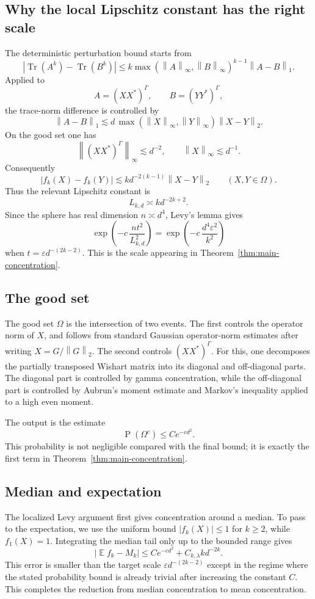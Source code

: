 \documentclass[11pt,reqno]{amsart}
\newcommand{\norm}[1]{\left\lVert#1\right\rVert}
\newcommand{\abs}[1]{\left\lvert#1\right\rvert}
\DeclareMathOperator{\Tr}{Tr}
\DeclareMathOperator{\E}{\mathbb{E}}
\DeclareMathOperator{\Prob}{P}
\newenvironment{revderived}{\begingroup\color{RevisionDerived}}{\endgroup}
\begin{document}
\begin{revderived}
\subsection{Why the local Lipschitz constant has the right scale}

The deterministic perturbation bound starts from
\[
  \abs{\Tr(A^k)-\Tr(B^k)}
  \le
  k\max(\norm A_\infty,\norm B_\infty)^{k-1}\norm{A-B}_1.
\]
Applied to
\[
  A=(XX^*)^\Gamma,\qquad B=(YY^*)^\Gamma,
\]
the trace-norm difference is controlled by
\[
  \norm{A-B}_1
  \lesssim
  d\,\max(\norm X_\infty,\norm Y_\infty)\norm{X-Y}_2.
\]
On the good set one has
\[
  \norm{(XX^*)^\Gamma}_\infty \lesssim d^{-2},
  \qquad
  \norm X_\infty \lesssim d^{-1}.
\]
Consequently
\[
  \abs{f_k(X)-f_k(Y)}
  \lesssim
  k d^{-2(k-1)}\norm{X-Y}_2
  \qquad (X,Y\in\Omega).
\]
Thus the relevant Lipschitz constant is
\[
  L_{k,d}\asymp k d^{-2k+2}.
\]
Since the sphere has real dimension \(n\asymp d^4\), Levy's lemma gives
\[
  \exp\left(-c\,\frac{n t^2}{L_{k,d}^2}\right)
  =
  \exp\left(-c\,\frac{d^4\varepsilon^2}{k^2}\right)
\]
when \(t=\varepsilon d^{-(2k-2)}\).  This is the scale appearing in
Theorem~\ref{thm:main-concentration}.

\subsection{The good set}

The good set \(\Omega\) is the intersection of two events.  The first controls
the operator norm of \(X\), and follows from standard Gaussian operator-norm
estimates after writing \(X=G/\norm G_2\).  The second controls
\((XX^*)^\Gamma\).  For this, one decomposes the partially transposed Wishart
matrix into its diagonal and off-diagonal parts.  The diagonal part is
controlled by gamma concentration, while the off-diagonal part is controlled
by Aubrun's moment estimate and Markov's inequality applied to a high even
moment.

The output is the estimate
\[
  \Prob(\Omega^c)\le C e^{-c d^2}.
\]
This probability is not negligible compared with the final bound; it is
exactly the first term in Theorem~\ref{thm:main-concentration}.

\subsection{Median and expectation}

The localized Levy argument first gives concentration around a median.  To
pass to the expectation, we use the uniform bound \(\abs{f_k(X)}\le1\) for
\(k\ge2\), while \(f_1(X)=1\).  Integrating the median tail only up to the
bounded range gives
\[
  \abs{\E f_k-M_k}
  \le
  C e^{-c d^2}+C_{k,\lambda}k d^{-2k}.
\]
This error is smaller than the target scale
\(\varepsilon d^{-(2k-2)}\) except in the regime where the stated probability
bound is already trivial after increasing the constant \(C\).  This completes
the reduction from median concentration to mean concentration.


\end{revderived}
\end{document}
